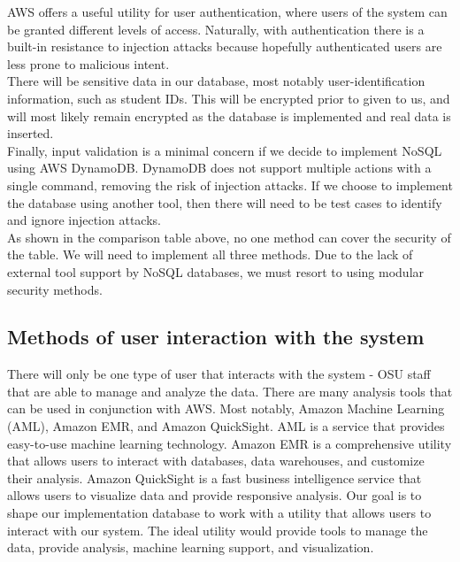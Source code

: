 \documentclass[10pt,draftclsnofoot,onecolumn,journal,compsoc]{IEEEtran}
\begin{document}
        \noindent AWS offers a useful utility for user authentication, where users of the system can be granted different levels of access. Naturally, with authentication there is a built-in resistance to injection attacks because hopefully authenticated users are less prone to malicious intent.\\ 
        
        \noindent There will be sensitive data in our database, most notably user-identification information, such as student IDs. This will be encrypted prior to given to us, and will most likely remain encrypted as the database is implemented and real data is inserted.\\
        
        \noindent Finally, input validation is a minimal concern if we decide to implement NoSQL using AWS DynamoDB. DynamoDB does not support multiple actions with a single command, removing the risk of injection attacks. If we choose to implement the database using another tool, then there will need to be test cases to identify and ignore injection attacks.\\
        
        \noindent As shown in the comparison table above, no one method can cover the security of the table. We will need to implement all three methods. Due to the lack of external tool support by NoSQL databases, we must resort to using modular security methods. 
    
        \subsection{Methods of user interaction with the system}
        There will only be one type of user that interacts with the system - OSU staff that are able to manage and analyze the data. There are many analysis tools that can be used in conjunction with AWS. Most notably, Amazon Machine Learning (AML), Amazon EMR, and Amazon QuickSight. AML is a service that provides easy-to-use machine learning technology. Amazon EMR is a comprehensive utility that allows users to interact with databases, data warehouses, and customize their analysis. Amazon QuickSight is a fast business intelligence service that allows users to visualize data and provide responsive analysis. Our goal is to shape our implementation database to work with a utility that allows users to interact with our system. The ideal utility would provide tools to manage the data, provide analysis, machine learning support, and visualization.
\end{document}
